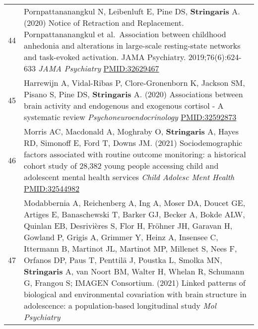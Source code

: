 \documentclass[
]{article}
\begin{document}
\begin{longtable}[]{@{}ll@{}}
\begin{minipage}[t]{0.01\columnwidth}
44\strut
\end{minipage} & \begin{minipage}[t]{0.94\columnwidth}\raggedright
Pornpattananangkul N, Leibenluft E, Pine DS, \textbf{Stringaris} A.
(2020) Notice of Retraction and Replacement. Pornpattananangkul et
al.~Association between childhood anhedonia and alterations in
large-scale resting-state networks and task-evoked activation. JAMA
Psychiatry. 2019;76(6):624-633 \emph{JAMA Psychiatry}
\url{PMID:32629467}\strut
\end{minipage}\tabularnewline
\begin{minipage}[t]{0.01\columnwidth}\raggedright
45\strut
\end{minipage} & \begin{minipage}[t]{0.94\columnwidth}\raggedright
Harrewijn A, Vidal-Ribas P, Clore-Gronenborn K, Jackson SM, Pisano S,
Pine DS, \textbf{Stringaris} A. (2020) Associations between brain
activity and endogenous and exogenous cortisol - A systematic review
\emph{Psychoneuroendocrinology} \url{PMID:32592873}\strut
\end{minipage}\tabularnewline
\begin{minipage}[t]{0.01\columnwidth}\raggedright
46\strut
\end{minipage} & \begin{minipage}[t]{0.94\columnwidth}\raggedright
Morris AC, Macdonald A, Moghraby O, \textbf{Stringaris} A, Hayes RD,
Simonoff E, Ford T, Downs JM. (2021) Sociodemographic factors associated
with routine outcome monitoring: a historical cohort study of 28,382
young people accessing child and adolescent mental health services
\emph{Child Adolesc Ment Health} \url{PMID:32544982}\strut
\end{minipage}\tabularnewline
\begin{minipage}[t]{0.01\columnwidth}\raggedright
47\strut
\end{minipage} & \begin{minipage}[t]{0.94\columnwidth}\raggedright
Modabbernia A, Reichenberg A, Ing A, Moser DA, Doucet GE, Artiges E,
Banaschewski T, Barker GJ, Becker A, Bokde ALW, Quinlan EB, Desrivières
S, Flor H, Fröhner JH, Garavan H, Gowland P, Grigis A, Grimmer Y, Heinz
A, Insensee C, Ittermann B, Martinot JL, Martinot MP, Millenet S, Nees
F, Orfanos DP, Paus T, Penttilä J, Poustka L, Smolka MN,
\textbf{Stringaris} A, van Noort BM, Walter H, Whelan R, Schumann G,
Frangou S; IMAGEN Consortium. (2021) Linked patterns of biological and
environmental covariation with brain structure in adolescence: a
population-based longitudinal study \emph{Mol Psychiatry}

\end{minipage}
\end{longtable}
\end{document}
